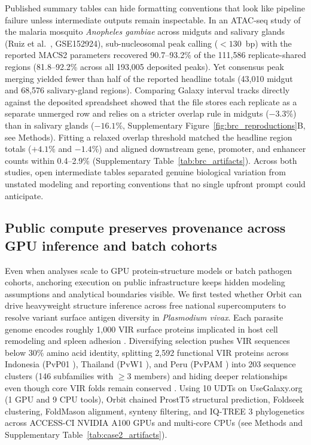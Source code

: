 \documentclass[11pt,letterpaper]{article}
\newcommand{\tool}[1]{\textsf{#1}}
\begin{document}
Published summary tables can hide formatting conventions that look like pipeline failure unless intermediate outputs remain inspectable. In an ATAC-seq study of the malaria mosquito \textit{Anopheles gambiae} across midguts and salivary glands (Ruiz et al.\ \cite{ruiz2021}, GSE152924), sub-nucleosomal peak calling ($< 130$~bp) with the reported \tool{MACS2} parameters recovered 90.7--93.2\% of the 111,586 replicate-shared regions (81.8--92.2\% across all 193,005 deposited peaks). Yet consensus peak merging yielded fewer than half of the reported headline totals (43,010 midgut and 68,576 salivary-gland regions). Comparing Galaxy interval tracks directly against the deposited spreadsheet showed that the file stores each replicate as a separate unmerged row and relies on a stricter overlap rule in midguts ($-3.3\%$) than in salivary glands ($-16.1\%$, Supplementary Figure~\ref{fig:brc_reproductions}B, see Methods). Fitting a relaxed overlap threshold matched the headline region totals ($+4.1\%$ and $-1.4\%$) and aligned downstream gene, promoter, and enhancer counts within 0.4--2.9\% (Supplementary Table~\ref{tab:brc_artifacts}). Across both studies, open intermediate tables separated genuine biological variation from unstated modeling and reporting conventions that no single upfront prompt could anticipate.

\subsection{Public compute preserves provenance across GPU inference and batch cohorts}

Even when analyses scale to GPU protein-structure models or batch pathogen cohorts, anchoring execution on public infrastructure keeps hidden modeling assumptions and analytical boundaries visible. We first tested whether \tool{Orbit} can drive heavyweight structure inference across free national supercomputers to resolve variant surface antigen diversity in \textit{Plasmodium vivax}. Each parasite genome encodes roughly 1,000 VIR surface proteins implicated in host cell remodeling and spleen adhesion \cite{carlton2008, lopez2013, auburn2016, minassian2021pvw1, demeulenaere2023, jackson2026}. Diversifying selection pushes VIR sequences below 30\% amino acid identity, splitting 2,592 functional VIR proteins across Indonesia (PvP01 \cite{auburn2016}), Thailand (PvW1 \cite{minassian2021pvw1}), and Peru (PvPAM \cite{demeulenaere2023}) into 203 sequence clusters (146 subfamilies with $\ge 3$ members) and hiding deeper relationships even though core VIR folds remain conserved \cite{harrison2020}. Using 10 UDTs on UseGalaxy.org (1 GPU and 9 CPU tools), \tool{Orbit} chained \tool{ProstT5} structural prediction, \tool{Foldseek} clustering, \tool{FoldMason} alignment, synteny filtering, and \tool{IQ-TREE 3} phylogenetics across ACCESS-CI NVIDIA A100 GPUs and multi-core CPUs (see Methods and Supplementary Table~\ref{tab:case2_artifacts}).
\end{document}
